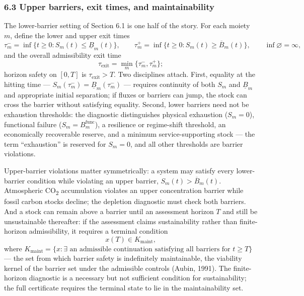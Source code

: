 \documentclass[11pt]{article}
\begin{document}
\subsubsection{6.3 Upper barriers, exit times, and
maintainability}\label{upper-barriers-exit-times-and-maintainability}

The lower-barrier setting of Section 6.1 is one half of the story. For
each moiety \(m\), define the lower and upper exit times
\[\tau_m^- = \inf\{ t \ge 0 : S_m(t) \le \underline{B}_m(t) \}, \qquad \tau_m^+ = \inf\{ t \ge 0 : S_m(t) \ge \overline{B}_m(t) \}, \qquad \inf\varnothing = \infty,\]
and the overall admissibility exit time
\[\tau_{\mathrm{exit}} = \min_m \{ \tau_m^-, \tau_m^+ \};\] horizon
safety on \([0,T]\) is \(\tau_{\mathrm{exit}} > T\). Two disciplines
attach. First, equality at the hitting time ---
\(S_m(\tau_m^-) = \underline{B}_m(\tau_m^-)\) --- requires continuity of
both \(S_m\) and \(\underline{B}_m\) and appropriate initial separation;
if fluxes or barriers can jump, the stock can cross the barrier without
satisfying equality. Second, lower barriers need not be exhaustion
thresholds: the diagnostic distinguishes physical exhaustion
(\(S_m = 0\)), functional failure (\(S_m = B_m^{\mathrm{func}}\)), a
resilience or regime-shift threshold, an economically recoverable
reserve, and a minimum service-supporting stock --- the term
``exhaustion'' is reserved for \(S_m = 0\), and all other thresholds are
barrier violations.

Upper-barrier violations matter symmetrically: a system may satisfy
every lower-barrier condition while violating an upper barrier,
\(S_m(t) > \overline{B}_m(t)\). Atmospheric CO\textsubscript{2} accumulation violates an
upper concentration barrier while fossil carbon stocks decline; the
depletion diagnostic must check both barriers. And a stock can remain
above a barrier until an assessment horizon \(T\) and still be
unsustainable thereafter: if the assessment claims sustainability rather
than finite-horizon admissibility, it requires a terminal condition
\[x(T) \in K_{\mathrm{maint}},\] where
\(K_{\mathrm{maint}} = \{ x : \exists \text{ an admissible continuation satisfying all barriers for } t \ge T \}\)
--- the set from which barrier safety is indefinitely maintainable, the
viability kernel of the barrier set under the admissible controls
(Aubin, 1991). The finite-horizon diagnostic is a necessary but not
sufficient condition for sustainability; the full certificate requires
the terminal state to lie in the maintainability set.
\end{document}
